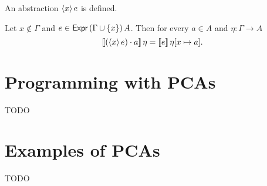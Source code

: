 \begin{proposition}
  \label{prop:Expr.defined_abstr}
  An abstraction $\langle x \rangle\, e$ is defined.
\end{proposition}

\begin{proposition}
  \label{prop:Expr.eq_abstr}
  Let $x \not\in \Gamma$ and $e \in \mathsf{Expr}\,(\Gamma \cup \{x\})\,A$.
  Then for every $a \in A$ and $\eta : \Gamma \to A$
  \begin{equation*}
    [\![ (\langle x \rangle\, e) \cdot a ]\!] \, \eta =
    [\![ e ]\!] \, \eta[x \mapsto a].
  \end{equation*}
\end{proposition}


\section{Programming with PCAs}

TODO

\section{Examples of PCAs}

TODO

